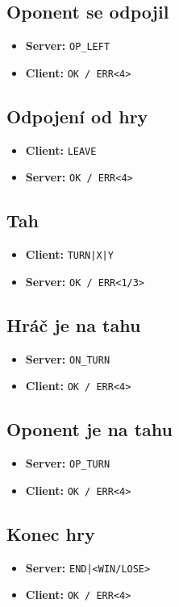 \documentclass[11pt,a4paper]{article}
\begin{document}
\subsection*{Oponent se odpojil}
\begin{itemize}
	\item \textbf{Server:} \texttt{OP\_LEFT}
	\item \textbf{Client:} \texttt{OK / ERR<4>}
\end{itemize}

\subsection*{Odpojení od hry}
\begin{itemize}
	\item \textbf{Client:} \texttt{LEAVE}
	\item \textbf{Server:} \texttt{OK / ERR<4>}
\end{itemize}

\subsection*{Tah}
\begin{itemize}
	\item \textbf{Client:} \texttt{TURN|X|Y}
	\item \textbf{Server:} \texttt{OK / ERR<1/3>}
\end{itemize}

\subsection*{Hráč je na tahu}
\begin{itemize}
	\item \textbf{Server:} \texttt{ON\_TURN}
	\item \textbf{Client:} \texttt{OK / ERR<4>}
\end{itemize}

\subsection*{Oponent je na tahu}
\begin{itemize}
	\item \textbf{Server:} \texttt{OP\_TURN}
	\item \textbf{Client:} \texttt{OK / ERR<4>}
\end{itemize}

\subsection*{Konec hry}
\begin{itemize}
	\item \textbf{Server:} \texttt{END|<WIN/LOSE>}
	\item \textbf{Client:} \texttt{OK / ERR<4>}
\end{itemize}
\end{document}
